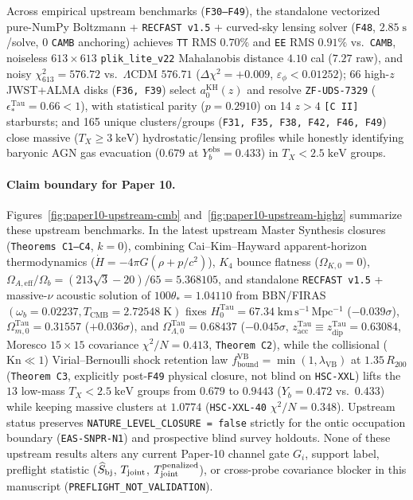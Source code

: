 \documentclass[11pt]{article}
\begin{document}
Across empirical upstream benchmarks (\texttt{F30--F49}), the standalone
vectorized pure-NumPy Boltzmann + \texttt{RECFAST v1.5} + curved-sky lensing
solver (\texttt{F48}, $2.85\;\mathrm{s}$/solve, $0$ \texttt{CAMB} anchoring)
achieves \texttt{TT} RMS $0.70\%$ and \texttt{EE} RMS $0.91\%$ vs.\
\texttt{CAMB}, noiseless $613\times 613$ \texttt{plik\_lite\_v22} Mahalanobis
distance $4.10$ cal ($7.27$ raw), and noisy $\chi^2_{613}=576.72$ vs.\
$\Lambda$CDM $576.71$ ($\Delta\chi^2=+0.009$, $\varepsilon_\phi<0.01252$); 66
high-$z$ JWST+ALMA disks (\texttt{F36, F39}) select $a_0^{\mathrm{KH}}(z)$ and
resolve \texttt{ZF-UDS-7329} ($\epsilon_*^{\mathrm{Tau}}=0.66<1$), with
statistical parity ($p=0.2910$) on 14 $z>4$ \texttt{[C II]} starbursts; and 165
unique clusters/groups (\texttt{F31, F35, F38, F42, F46, F49}) close massive
($T_X\ge 3\;\mathrm{keV}$) hydrostatic/lensing profiles while honestly
identifying baryonic AGN gas evacuation ($0.679$ at $Y_b^{\mathrm{obs}}=0.433$)
in $T_X<2.5\;\mathrm{keV}$ groups.

\paragraph{Claim boundary for Paper 10.}
Figures~\ref{fig:paper10-upstream-cmb} and~\ref{fig:paper10-upstream-highz}
summarize these upstream benchmarks. In the latest upstream Master Synthesis
closures (\texttt{Theorems~C1--C4}, $k=0$), combining Cai--Kim--Hayward
apparent-horizon thermodynamics ($\dot{H}=-4\pi G(\rho+p/c^2)$), $K_4$ bounce
flatness ($\Omega_{K,0}=0$), $\Omega_{A,\mathrm{eff}}/\Omega_b=(213\sqrt{3}-20)/65=5.368105$,
and standalone \texttt{RECFAST v1.5} + massive-$\nu$ acoustic solution of
$100\theta_*=1.04110$ from BBN/FIRAS $(\omega_b=0.02237,T_{\mathrm{CMB}}=2.72548\;\mathrm{K})$
fixes $H_0^{\mathrm{Tau}}=67.34\;\mathrm{km\,s^{-1}\,Mpc^{-1}}$ ($-0.039\sigma$),
$\Omega_{m,0}^{\mathrm{Tau}}=0.31557$ ($+0.036\sigma$), and
$\Omega_{\Lambda,0}^{\mathrm{Tau}}=0.68437$ ($-0.045\sigma$,
$z_{\mathrm{acc}}^{\mathrm{Tau}}\equiv z_{\mathrm{dip}}^{\mathrm{Tau}}=0.63084$,
Moresco $15\times 15$ covariance $\chi^2/N=0.413$, \texttt{Theorem~C2}), while
the collisional ($\mathrm{Kn}\ll 1$) Virial--Bernoulli shock retention law
$f_{\mathrm{bound}}^{\mathrm{VB}}=\min(1,\lambda_{\mathrm{VB}})$ at $1.35\,R_{200}$
(\texttt{Theorem~C3}, explicitly post-\texttt{F49} physical closure, not blind
on \texttt{HSC-XXL}) lifts the $13$ low-mass $T_X<2.5\;\mathrm{keV}$ groups from
$0.679$ to $0.9443$ ($Y_b=0.472$ vs.\ $0.433$) while keeping massive clusters at
$1.0774$ (\texttt{HSC-XXL-40} $\chi^2/N=0.348$). Upstream status preserves
\texttt{NATURE\_LEVEL\_CLOSURE = false} strictly for the ontic occupation
boundary (\texttt{EAS-SNPR-N1}) and prospective blind survey holdouts. None of
these upstream results alters any current Paper-10 channel gate $G_i$, support
label, preflight statistic ($\widehat S_{\rm bj}$, $T_{\rm joint}$,
$T_{\rm joint}^{\rm penalized}$), or cross-probe covariance blocker in this
manuscript (\texttt{PREFLIGHT\_NOT\_VALIDATION}).
\end{document}
